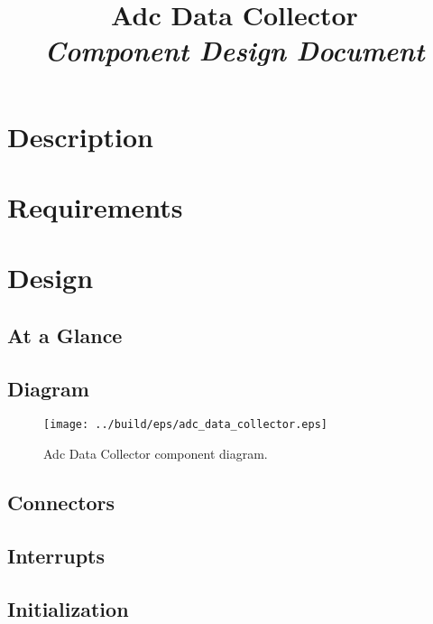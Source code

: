 



\title{\textbf{Adc Data Collector} \\
\large\textit{Component Design Document}}
\date{}
\maketitle

\section{Description}


\section{Requirements}


\section{Design}

\subsection{At a Glance}


\subsection{Diagram}
\begin{figure}[H]
  \texttt{[image: ../build/eps/adc\_data\_collector.eps]}
  \caption{Adc Data Collector component diagram.}
\end{figure}

\subsection{Connectors}


\subsection{Interrupts}



\subsection{Initialization}


